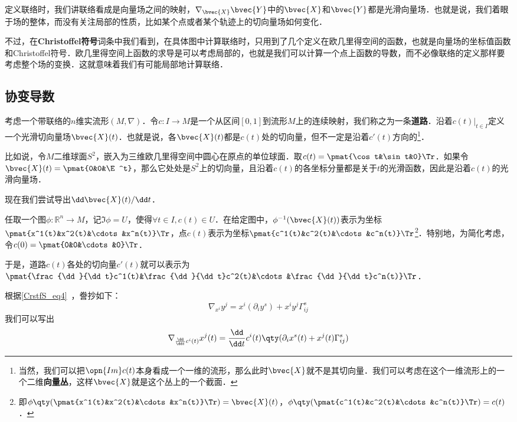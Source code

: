 

定义联络时，我们讲联络看成是向量场之间的映射，$\nabla_\bvec{X}\bvec{Y}$中的$\bvec{X}$和$\bvec{Y}$都是光滑向量场．也就是说，我们着眼于场的整体，而没有关注局部的性质，比如某个点或者某个轨迹上的切向量场如何变化．

不过，在\textbf{Christoffel符号}词条中我们看到，在具体图中计算联络时，只用到了几个定义在欧几里得空间的函数，也就是向量场的坐标值函数和Christoffel符号．欧几里得空间上函数的求导是可以考虑局部的，也就是我们可以计算一个点上函数的导数，而不必像联络的定义那样要考虑整个场的变换．这就意味着我们有可能局部地计算联络．

\subsection{协变导数}

考虑一个带联络的$n$维实流形$(M, \nabla)$．令$c:I\to M$是一个从区间$[0, 1]$到流形$M$上的连续映射，我们称之为一条\textbf{道路}．沿着$c(t)|_{t\in I}$定义一个光滑切向量场$\bvec{X}(t)$．也就是说，各$\bvec{X}(t)$都是$c(t)$处的切向量，但不一定是沿着$c'(t)$方向的\footnote{当然，我们可以把$\opn{Im}c(t)$本身看成一个一维的流形，那么此时$\bvec{X}$就不是其切向量．我们可以考虑在这个一维流形上的一个二维\textbf{向量丛}，这样$\bvec{X}$就是这个丛上的一个截面．}．

比如说，令$M$二维球面$S^2$，嵌入为三维欧几里得空间中圆心在原点的单位球面．取$c(t)=\pmat{\cos t&\sin t&0}\Tr$．如果令$\bvec{X}(t)=\pmat{0&0&\E^t}$，那么它处处是$S^2$上的切向量，且沿着$c(t)$的各坐标分量都是关于$t$的光滑函数，因此是沿着$c(t)$的光滑向量场．

现在我们尝试导出$\dd\bvec{X}(t)/\dd t$．

任取一个图$\phi:\mathbb{R}^n\to M$，记$\Im\phi=U$，使得$\forall t\in I, c(t)\in U$．在给定图中，$\phi^{-1}(\bvec{X}(t))$表示为坐标$\pmat{x^1(t)&x^2(t)&\cdots&x^n(t)}\Tr$，点$c(t)$表示为坐标$\pmat{c^1(t)&c^2(t)&\cdots&c^n(t)}\Tr$\footnote{即$\phi\qty(\pmat{x^1(t)&x^2(t)&\cdots&x^n(t)}\Tr)=\bvec{X}(t)$，$\phi\qty(\pmat{c^1(t)&c^2(t)&\cdots&c^n(t)}\Tr)=c(t)$．}．特别地，为简化考虑，令$c(0)=\pmat{0&0&\cdots&0}\Tr$．

于是，道路$c(t)$各处的切向量$c'(t)$就可以表示为$\pmat{\frac{\dd}{\dd t}c^1(t)&\frac{\dd}{\dd t}c^2(t)&\cdots&\frac{\dd}{\dd t}c^n(t)}\Tr$．

根据\autoref{CrstfS_eq4}~，誊抄如下：
\begin{equation}
\nabla_{x^i}y^j=x^i(\partial_iy^s)+x^iy^j\Gamma^s_{ij}
\end{equation}
我们可以写出
\begin{equation}\label{CoDer_eq1}
\nabla_{\frac{\dd}{\dd t}c^i(t)}x^j(t)=\frac{\dd}{\dd t}c^i(t)\qty(\partial_ix^s(t)+x^j(t)\Gamma^s_{ij})
\end{equation}

